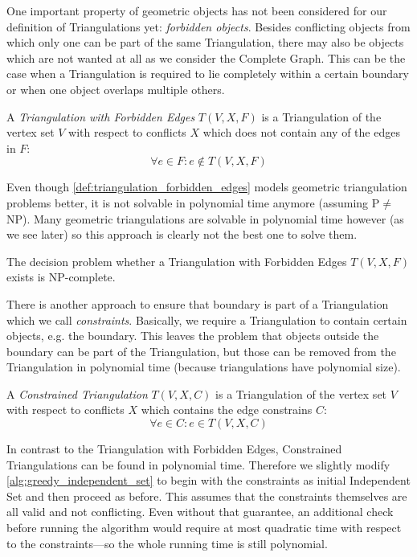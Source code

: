One important property of geometric objects has not been considered
for our definition of Triangulations yet: \emph{forbidden objects}.
Besides conflicting objects
from which only one can be part of the same Triangulation, there may
also be objects which are not wanted at all as we consider the
Complete Graph. This can be the case when a Triangulation is required
to lie completely within a certain boundary or when one object
overlaps multiple others.

\begin{definition}
  \label{def:triangulation_forbidden_edges}
  A \emph{Triangulation with Forbidden Edges} \(T(V,X,F)\) is a 
  Triangulation of the vertex set \(V\) with respect to conflicts
  \(X\) which does not contain any of the edges in \(F\):
  \[ \forall e \in F : e \not\in T(V,X,F) \]
\end{definition}

Even though \cref{def:triangulation_forbidden_edges} models
geometric triangulation problems better, it is not solvable in
polynomial time anymore (assuming P\(\not=\)NP). Many geometric
triangulations are solvable in polynomial time however (as we see
later) so this approach is clearly not the best one to solve them.

\begin{theorem}
  The decision problem whether 
  a Triangulation with Forbidden Edges \(T(V,X,F)\) exists
  is NP-complete.
  \cite[triangulation existence problem]{triangulation_forbidden_edges}
\end{theorem}

There is another approach to ensure that boundary is part of a
Triangulation which we call \emph{constraints}. Basically, we require
a Triangulation to contain certain objects, e.g. the boundary. This
leaves the problem that objects outside the boundary can be part of
the Triangulation, but those can be removed from the Triangulation
in polynomial time (because triangulations have polynomial size).

\begin{definition}
  \label{def:constrained_triangulation}
  A \emph{Constrained Triangulation} \(T(V,X,C)\) is a Triangulation
  of the vertex set \(V\) with respect to conflicts \(X\) which 
  contains the edge constrains \(C\):
  \[ \forall e \in C : e \in T(V,X,C) \]
\end{definition}

In contrast to the Triangulation with Forbidden Edges, Constrained
Triangulations can be found in polynomial time. Therefore we slightly
modify \cref{alg:greedy_independent_set} to begin with the constraints
as initial Independent Set and then proceed as before. This assumes
that the constraints themselves are all valid and not conflicting.
Even without that guarantee, an additional check before running the
algorithm would require at most quadratic time with respect to the
constraints---so the whole running time is still polynomial.

